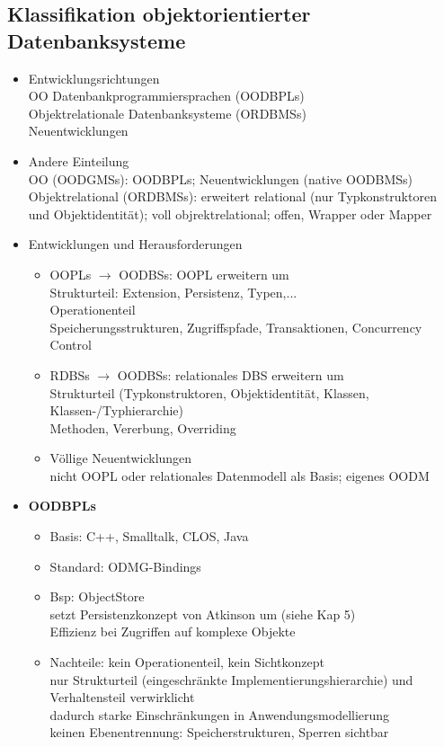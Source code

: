 \subsection{Klassifikation objektorientierter Datenbanksysteme}
\begin{itemize}
	\item Entwicklungsrichtungen\\
	OO Datenbankprogrammiersprachen (OODBPLs)\\
	Objektrelationale Datenbanksysteme (ORDBMSs)\\
	Neuentwicklungen
	
	\item Andere Einteilung\\
	OO (OODGMSs): OODBPLs; Neuentwicklungen (native OODBMSs)\\
	Objektrelational (ORDBMSs): erweitert relational (nur Typkonstruktoren und Objektidentität); voll objrektrelational; offen, Wrapper oder Mapper
	
	\item Entwicklungen und Herausforderungen
	\begin{itemize}
		\item OOPLs $\to$ OODBSs: OOPL erweitern um\\
		Strukturteil: Extension, Persistenz, Typen,...\\
		Operationenteil\\
		Speicherungsstrukturen, Zugriffspfade, Transaktionen, Concurrency Control
		
		\item RDBSs $\to$ OODBSs: relationales DBS erweitern um\\
		Strukturteil (Typkonstruktoren, Objektidentität, Klassen, Klassen-/Typhierarchie)\\
		Methoden, Vererbung, Overriding
		
		\item Völlige Neuentwicklungen\\
		nicht OOPL oder relationales Datenmodell als Basis; eigenes OODM
	\end{itemize}
	
	\item \textbf{OODBPLs}
	\begin{itemize}
		\item Basis: C++, Smalltalk, CLOS, Java
		\item Standard: ODMG-Bindings
		\item Bsp: ObjectStore\\
		setzt Persistenzkonzept von Atkinson um (siehe Kap 5)\\
		Effizienz bei Zugriffen auf komplexe Objekte
		\item Nachteile: kein Operationenteil, kein Sichtkonzept\\
		nur Strukturteil (eingeschränkte Implementierungshierarchie) und Verhaltensteil verwirklicht\\
		dadurch starke Einschränkungen in Anwendungsmodellierung\\
		keinen Ebenentrennung: Speicherstrukturen, Sperren sichtbar
	\end{itemize}
	

\end{itemize}
